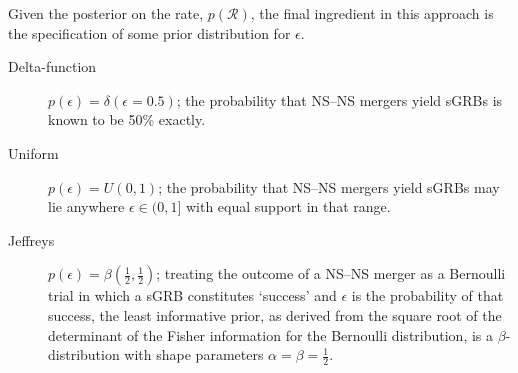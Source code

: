\documentclass[twocolumn,nofootinbib]{revtex4-1}
\newcommand{\cbcrate}{{{\mathcal R}}}
\newcommand{\BNS}{\ac{NS}--\ac{NS}\xspace}
\newcommand{\ish}[1]{{\color{blue}{#1}}}
\begin{document}
Given the posterior on the rate, $p(\cbcrate)$, the final ingredient
in this approach is the specification of some prior distribution for
$\epsilon$.  \ish{Given the lack of information on the value and
  distribution of $\epsilon$, we choose three plausible priors and
  study their effects on our beaming angle inference.  Our choice of
  priors are:}
%
\begin{description}
\item [Delta-function] $p(\epsilon) = \delta(\epsilon=0.5)$;
        the probability that \BNS mergers yield \acp{sGRB} is known to be 50\%
        exactly.

\item [Uniform] $p(\epsilon)=U(0,1)$;
        the probability that \BNS mergers yield \acp{sGRB} may lie anywhere
    $\epsilon \in (0,1]$ with equal support in that range. 

    \item [Jeffreys] $p(\epsilon)=\beta(\frac{1}{2},\frac{1}{2})$; treating the
        outcome of a \BNS merger as a Bernoulli trial in which a \ac{sGRB}
        constitutes `success' and $\epsilon$ is the probability of that success,
        the least informative prior, as derived from the square root of the
        determinant of the Fisher information for the Bernoulli distribution, is
        a $\beta$-distribution with shape parameters $\alpha=\beta=\frac{1}{2}$.
\end{description}


\end{document}
